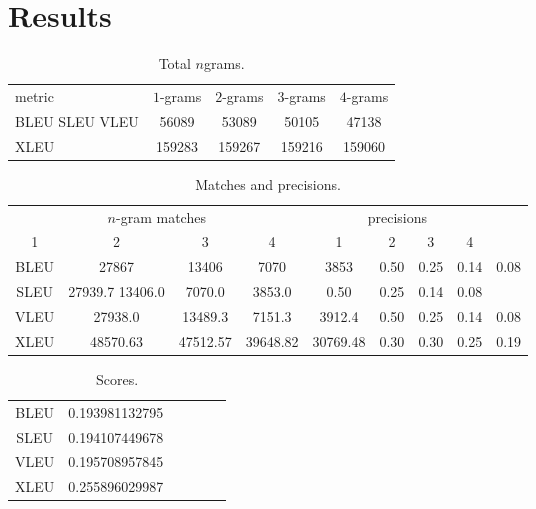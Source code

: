 
\section{Results}
\label{sec:results}

\begin{table}[h]
  \centering
  \begin{tabular}{|l||c|c|c|c|}
    \hline
metric & $1$-grams & $2$-grams & $3$-grams & $4$-grams \\
BLEU SLEU VLEU & 56089 &  53089 & 50105 & 47138 \\
XLEU & 159283 & 159267 & 159216 & 159060 \\
\hline
  \end{tabular}
  \caption{Total $n$grams.}
  \label{tab:totalngrams}
\end{table}

\begin{table}[h]
  \centering
  \begin{tabular}{|c|c|c|c|c|c|c|c|c|}
\hline
\multicolumn{4}{c}{$n$-gram matches} & \multicolumn{4}{c}{precisions} \\
1 & 2 & 3 & 4 & 1 & 2 & 3 & 4 \\
BLEU & 27867 & 13406 & 7070 & 3853 & 0.50 & 0.25 & 0.14 & 0.08 \\
SLEU & 27939.7 13406.0 & 7070.0 & 3853.0 & 0.50 & 0.25 & 0.14 & 0.08 \\
VLEU & 27938.0 & 13489.3 & 7151.3 & 3912.4 & 0.50 & 0.25 & 0.14 & 0.08 \\
XLEU & 48570.63 & 47512.57 & 39648.82 & 30769.48 & 0.30 & 0.30 & 0.25 & 0.19 \\
\hline
  \end{tabular}
  \caption{Matches and precisions.}
  \label{tab:matches}
\end{table}


\begin{table}[h]
  \centering
  \begin{tabular}{|c|c|c|c||c|c|}
\hline
BLEU & 0.193981132795 \\
SLEU & 0.194107449678 \\
VLEU & 0.195708957845 \\
XLEU & 0.255896029987 \\
\hline
  \end{tabular}
  \caption{Scores.}
  \label{tab:scores}
\end{table}
